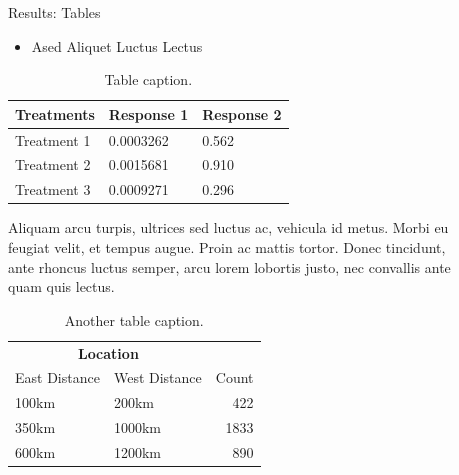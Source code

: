 \documentclass{beamer} %
\begin{document}
\begin{frame}[t]
\begin{columns}[t]
\begin{column}{0.465\textwidth}

\end{column} %

\begin{column}{0.03\textwidth}\end{column} %
 
\begin{column}{0.465\textwidth} %


\begin{block}{Results: Tables}
	\begin{itemize}
		\item Ased Aliquet Luctus Lectus
	\end{itemize}
	
	\begin{table}
		\caption{Table caption.}
		\begin{tabular}{l l l}
			\toprule
			\textbf{Treatments} & \textbf{Response 1} & \textbf{Response 2}\\
			\midrule
			Treatment 1 & 0.0003262 & 0.562 \\
			Treatment 2 & 0.0015681 & 0.910 \\
			Treatment 3 & 0.0009271 & 0.296 \\
			\bottomrule
		\end{tabular}
	\end{table}
	
	\bigskip\bigskip %
	
	Aliquam arcu turpis, ultrices sed luctus ac, vehicula id metus. Morbi eu feugiat velit, et tempus augue. Proin ac mattis tortor. Donec tincidunt, ante rhoncus luctus semper, arcu lorem lobortis justo, nec convallis ante quam quis lectus.
	
	\begin{table} %
		\caption{Another table caption.}
		\begin{tabular}{l l r}
			\toprule
			\multicolumn{2}{c}{\textbf{Location}} \\
			\cmidrule(r){1-2}
			East Distance & West Distance & Count \\
			\midrule
			100km & 200km & 422 \\
			350km & 1000km & 1833 \\
			600km & 1200km & 890 \\
			\bottomrule
		\end{tabular}
	\end{table}
	

\end{block}
\end{column}
\end{columns}
\end{frame}
\end{document}
